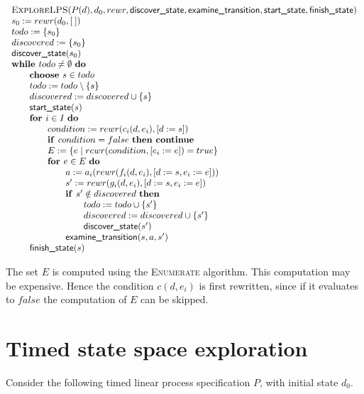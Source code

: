 \documentclass{article}
\newcommand{\Space}{\text{\ }}
\newcommand{\If}{\text{\textbf{if }}}
\newcommand{\Do}{\text{\textbf{do }}}
\newcommand{\Then}{\text{\textbf{then }}}
\newcommand{\For}{\text{\textbf{for }}}
\newcommand{\While}{\text{\textbf{while }}}
\newcommand{\Continue}{\text{\textbf{continue }}}
\newcommand{\Choose}{\text{\textbf{choose }}}
\begin{document}
\[
\begin{tabular}{l}
\textsc{ExploreLPS}($P(d), d_0, rewr, \textsf{discover\_state}, \textsf{examine\_transition},
\textsf{start\_state}, \textsf{finish\_state})$ \\
$s_0 := rewr(d_0, [\:])$ \\
$todo := \{ s_0 \}$ \\
$discovered := \{ s_0 \}$ \\
$\textsf{discover\_state}(s_0)$ \\
$\While todo \neq \emptyset \Space \Do$ \\
\qquad \Choose $s \in todo$ \\
\qquad $todo := todo \setminus \{s\}$ \\
\qquad $discovered := discovered \cup \{s\}$ \\
\qquad $\textsf{start\_state}(s)$ \\
\qquad $\For i \in I  \Space \Do$ \\
\qquad \qquad $condition := rewr(c_i(d, e_i), [d := s])$ \\
\qquad \qquad $\If condition = false  \Space \Then \Continue$ \\
\qquad \qquad $E := \{ e \mid rewr(condition, [e_i := e]) = true \}$ \\
\qquad \qquad $\For e \in E  \Space \Do$ \\
\qquad \qquad \qquad $a := a_i(rewr(f_i(d,e_i), [d:=s,e_i:=e]))$ \\
\qquad \qquad \qquad $s' := rewr(g_i(d,e_i), [d:=s,e_i:=e])$ \\
\qquad \qquad \qquad $\If s' \notin discovered \Space \Then$ \\
\qquad \qquad \qquad \qquad $todo := todo \cup \{ s' \}$ \\
\qquad \qquad \qquad \qquad $discovered := discovered \cup \{s'\}$ \\
\qquad \qquad \qquad \qquad $\textsf{discover\_state}(s')$ \\
\qquad \qquad \qquad $\textsf{examine\_transition}(s, a, s')$ \\
\qquad $\textsf{finish\_state}(s)$ \\
\end{tabular}
\]

The set $E$ is computed using the \textsc{Enumerate} algorithm. This computation may be expensive. Hence the condition $c(d,e_i)$ is first rewritten, since if it evaluates to $false$ the computation of $E$ can be skipped.

\newpage
\section{Timed state space exploration}
Consider the following timed linear process specification $P$, with initial state $d_0$.
\end{document}
